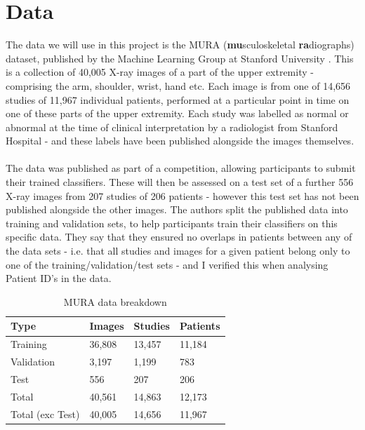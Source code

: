 \documentclass[11pt]{article} %
\theoremstyle{plain}
\theoremstyle{definition}
\begin{document}
\section{Data}
The data we will use in this project is the MURA (\textbf{mu}sculoskeletal \textbf{ra}diographs) dataset, published by the Machine Learning Group at Stanford University \cite{MURA2017}. This is a collection of 40,005 X-ray images of a part of the upper extremity - comprising the arm, shoulder, wrist, hand etc. Each image is from one of 14,656 studies of 11,967 individual patients, performed at a particular point in time on one of these parts of the upper extremity. Each study was labelled as normal or abnormal at the time of clinical interpretation by a radiologist from Stanford Hospital - and these labels have been published alongside the images themselves. 
\\
\\
\noindent
The data was published as part of a competition, allowing participants to submit their trained classifiers. These will then be assessed on a test set of a further 556 X-ray images from 207 studies of 206 patients - however this test set has not been published alongside the other images. The authors split the published data into training and validation sets, to help participants train their classifiers on this specific data. They say that they ensured no overlaps in patients between any of the data sets - i.e. that all studies and images for a given patient belong only to one of the training/validation/test sets - and I verified this when analysing Patient ID's in the data.
\begin{table}[!ht]
\centering
\caption{MURA data breakdown}
\label{MURA_Breakdown_ByType}
\begin{tabular}{@{}llll@{}}
\toprule
Type & Images & Studies & Patients \\ \midrule
Training & 36,808 & 13,457 & 11,184 \\
Validation & 3,197 & 1,199 & 783 \\
Test & 556 & 207 & 206 \\
\bottomrule
Total & 40,561 & 14,863 & 12,173 \\
\hline
Total (exc Test) & 40,005 & 14,656 & 11,967 \\ \bottomrule
\end{tabular}
\end{table}
\\
\noindent
\end{document}

